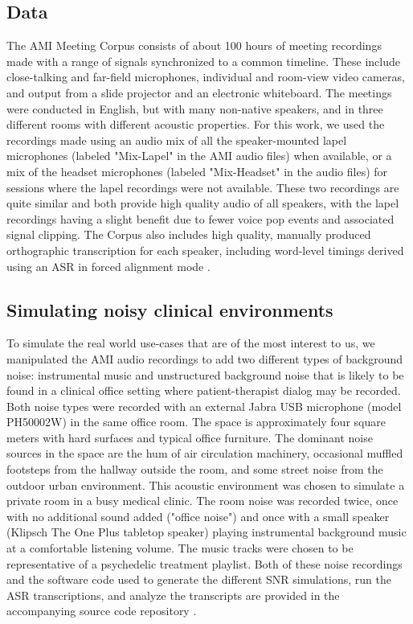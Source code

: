 \documentclass{article}
\begin{document}
\subsection{Data}
The AMI Meeting Corpus \cite{ami2006} consists of about 100 hours of meeting recordings made with a range of signals synchronized to a common timeline. These include close-talking and far-field microphones, individual and room-view video cameras, and output from a slide projector and an electronic whiteboard. The meetings were conducted in English, but with many non-native speakers, and in three different rooms with different acoustic properties. For this work, we used the recordings made using an audio mix of all the speaker-mounted lapel microphones (labeled "Mix-Lapel" in the AMI audio files) when available, or a mix of the headset microphones (labeled "Mix-Headset" in the audio files) for sessions where the lapel recordings were not available. These two recordings are quite similar and both provide high quality audio of all speakers, with the lapel recordings having a slight benefit due to fewer voice pop events and associated signal clipping. The Corpus also includes high quality, manually produced orthographic transcription for each speaker, including word-level timings derived using an ASR in forced alignment mode \cite{ami2006,rousso2024forcedalignment}.

\subsection{Simulating noisy clinical environments}
To simulate the real world use-cases that are of the most interest to us, we manipulated the AMI audio recordings to add two different types of background noise: instrumental music and unstructured background noise that is likely to be found in a clinical office setting where patient-therapist dialog may be recorded. Both noise types were recorded with an external Jabra USB microphone (model PH50002W) in the same office room. The space is approximately four square meters with hard surfaces and typical office furniture. The dominant noise sources in the space are the hum of air circulation machinery, occasional muffled footsteps from the hallway outside the room, and some street noise from the outdoor urban environment. This acoustic environment was chosen to simulate a private room in a busy medical clinic. The room noise was recorded twice, once with no additional sound added ("office noise") and once with a small speaker (Klipsch The One Plus tabletop speaker) playing instrumental background music at a comfortable listening volume. The music tracks were chosen to be representative of a psychedelic treatment playlist. Both of these noise recordings and the software code used to generate the different SNR simulations, run the ASR transcriptions, and analyze the transcripts are provided in the accompanying source code repository \cite{asr_hallucination}.
\end{document}
